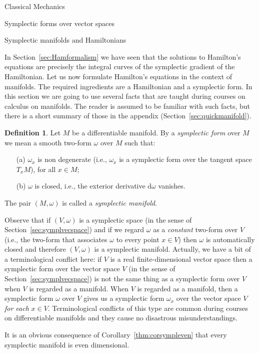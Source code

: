 \documentclass[oneside,a4paper,11pt]{amsbook}
\newcommand{\dd}{\mathrm d}
\theoremstyle{remark}\newtheorem{exercise}{Exercise}[chapter]
\theoremstyle{plain}\newtheorem{teo}{Theorem}[section]
\theoremstyle{plain}\newtheorem{lem}[teo]{Lemma}
\theoremstyle{plain}\newtheorem{prop}[teo]{Proposition}
\theoremstyle{plain}\newtheorem{cor}[teo]{Corollary}
\theoremstyle{definition}\newtheorem{defin}[teo]{Definition}
\theoremstyle{remark}\newtheorem{rem}[teo]{Remark}
\theoremstyle{definition}\newtheorem{notation}[teo]{Notation}
\theoremstyle{definition}\newtheorem{convention}[teo]{Convention}
\theoremstyle{definition}\newtheorem{example}[teo]{Example}
\numberwithin{section}{chapter}
\numberwithin{equation}{section}
\begin{document}
\begin{chapter}{Classical Mechanics}
\begin{section}{Symplectic forms over vector spaces}
\end{section}

\begin{section}{Symplectic manifolds and Hamiltonians}
\label{sec:symplmanifold}

In Section~\ref{sec:Hamformalism} we have seen that the solutions to Hamilton's equations are precisely
the integral curves of the symplectic gradient of the Hamiltonian. Let us now formulate Hamilton's equations
in the context of manifolds. The required ingredients are a Hamiltonian and a symplectic form.
In this section we are going to use several facts that are taught during courses on calculus on manifolds.
The reader is assumed to be familiar with such facts, but there is a short summary of those
in the appendix (Section~\ref{sec:quickmanifold}).

\begin{defin}
Let $M$ be a differentiable manifold. By a {\em symplectic form\/} over $M$ we mean a smooth two-form
$\omega$ over $M$ such that:
\begin{itemize}
\item[(a)] $\omega_x$ is non degenerate (i.e., $\omega_x$ is a symplectic form over the tangent space $T_xM$),
for all $x\in M$;
\item[(b)] $\omega$ is closed, i.e., the exterior derivative $\dd\omega$ vanishes.
\end{itemize}
The pair $(M,\omega)$ is called a {\em symplectic manifold}.
\end{defin}
Observe that if $(V,\omega)$ is a symplectic space (in the sense of Section~\ref{sec:symplvecspace})
and if we regard $\omega$ as a {\em constant\/} two-form over $V$ (i.e., the two-form that associates $\omega$
to every point $x\in V$) then $\omega$ is automatically closed and therefore
$(V,\omega)$ is a symplectic manifold. Actually, we have a bit of a terminological conflict here: if $V$
is a real finite-dimensional vector space then a symplectic form over the vector space $V$
(in the sense of Section~\ref{sec:symplvecspace}) is not the same thing as a symplectic form over $V$ when $V$ is
regarded as a manifold. When $V$ is regarded as a manifold, then a symplectic form $\omega$ over $V$ gives us a
symplectic form $\omega_x$ over the vector space $V$ {\em for each\/} $x\in V$. Terminological conflicts of this type are
common during courses on differentiable manifolds and they cause no disastrous misunderstandings.

It is an obvious consequence of Corollary~\ref{thm:corsympleven} that every symplectic manifold is even dimensional.


\end{section}
\end{chapter}
\end{document}

